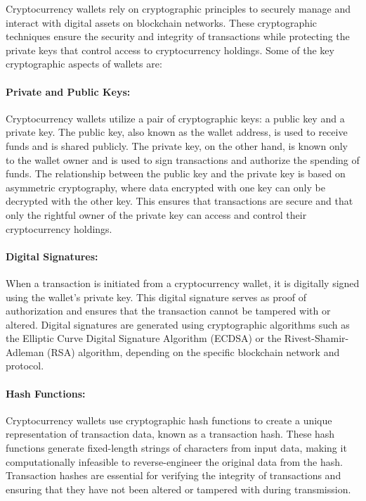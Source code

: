 Cryptocurrency wallets rely on cryptographic principles to securely manage and
interact with digital assets on blockchain networks. These cryptographic
techniques ensure the security and integrity of transactions while protecting
the private keys that control access to cryptocurrency holdings. Some of the
key cryptographic aspects of wallets are:

\paragraph{Private and Public Keys:}
Cryptocurrency wallets utilize a pair of cryptographic keys: a public key and a
private key. The public key, also known as the wallet address, is used to
receive funds and is shared publicly. The private key, on the other hand, is
known only to the wallet owner and is used to sign transactions and authorize
the spending of funds. The relationship between the public key and the private
key is based on asymmetric cryptography, where data encrypted with one key can
only be decrypted with the other key. This ensures that transactions are secure
and that only the rightful owner of the private key can access and control
their cryptocurrency holdings.

\paragraph{Digital Signatures:}
When a transaction is initiated from a cryptocurrency wallet, it is digitally
signed using the wallet's private key. This digital signature serves as proof
of authorization and ensures that the transaction cannot be tampered with or
altered. Digital signatures are generated using cryptographic algorithms such
as the Elliptic Curve Digital Signature Algorithm (ECDSA) or the
Rivest-Shamir-Adleman (RSA) algorithm, depending on the specific blockchain
network and protocol.

\paragraph{Hash Functions:}
Cryptocurrency wallets use cryptographic hash functions to create a unique
representation of transaction data, known as a transaction hash. These hash
functions generate fixed-length strings of characters from input data, making
it computationally infeasible to reverse-engineer the original data from the
hash. Transaction hashes are essential for verifying the integrity of
transactions and ensuring that they have not been altered or tampered with
during transmission.

